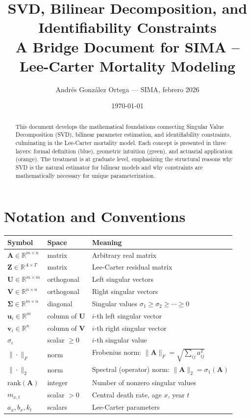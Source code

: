 \documentclass[11pt,a4paper]{article}
\title{\textbf{SVD, Bilinear Decomposition, and Identifiability Constraints} \\[0.5em]
\large A Bridge Document for SIMA -- Lee-Carter Mortality Modeling}
\author{Andr\'{e}s Gonz\'{a}lez Ortega --- SIMA, febrero 2026}
\date{\today}
\begin{document}
\maketitle

\begin{abstract}
This document develops the mathematical foundations connecting Singular Value Decomposition (SVD),
bilinear parameter estimation, and identifiability constraints, culminating in the Lee-Carter
mortality model. Each concept is presented in three layers: formal definition (blue), geometric
intuition (green), and actuarial application (orange). The treatment is at graduate level,
emphasizing the structural reasons why SVD is the natural estimator for bilinear models and
why constraints are mathematically necessary for unique parameterization.
\end{abstract}

\tableofcontents
\newpage

\section{Notation and Conventions}

\begin{tabular}{@{} l l l @{}}
\toprule
\textbf{Symbol} & \textbf{Space} & \textbf{Meaning} \\
\midrule
$\bm{A} \in \mathbb{R}^{m \times n}$ & matrix & Arbitrary real matrix \\
$\bm{Z} \in \mathbb{R}^{A \times T}$ & matrix & Lee-Carter residual matrix \\
$\bm{U} \in \mathbb{R}^{m \times m}$ & orthogonal & Left singular vectors \\
$\bm{V} \in \mathbb{R}^{n \times n}$ & orthogonal & Right singular vectors \\
$\bm{\Sigma} \in \mathbb{R}^{m \times n}$ & diagonal & Singular values $\sigma_1 \geq \sigma_2 \geq \cdots \geq 0$ \\
$\bm{u}_i \in \mathbb{R}^{m}$ & column of $\bm{U}$ & $i$-th left singular vector \\
$\bm{v}_i \in \mathbb{R}^{n}$ & column of $\bm{V}$ & $i$-th right singular vector \\
$\sigma_i$ & scalar $\geq 0$ & $i$-th singular value \\
$\|\cdot\|_F$ & norm & Frobenius norm: $\|\bm{A}\|_F = \sqrt{\sum_{ij} a_{ij}^2}$ \\
$\|\cdot\|_2$ & norm & Spectral (operator) norm: $\|\bm{A}\|_2 = \sigma_1(\bm{A})$ \\
$\mathrm{rank}(\bm{A})$ & integer & Number of nonzero singular values \\
$m_{x,t}$ & scalar $> 0$ & Central death rate, age $x$, year $t$ \\
$a_x, b_x, k_t$ & scalars & Lee-Carter parameters \\
\bottomrule
\end{tabular}
\end{document}
